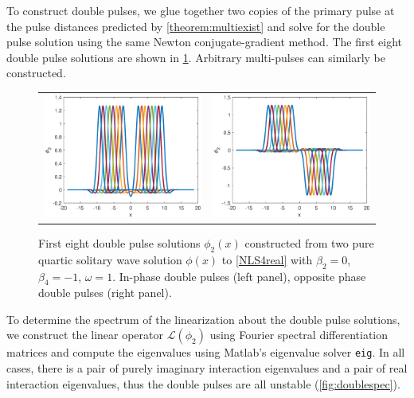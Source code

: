 \documentclass[12pt]{article}
\def\calL{{\mathcal L}}
\begin{document}
To construct double pulses, we glue together two copies of the primary pulse at the pulse distances predicted by \cref{theorem:multiexist} and solve for the double pulse solution using the same Newton conjugate-gradient method. The first eight double pulse solutions are shown in \cref{fig:doublepulses}. Arbitrary multi-pulses can similarly be constructed.

\begin{figure}[H]
\centering
\begin{tabular}{cc}
\includegraphics[width=8cm]{images/DPplus.eps} &
\includegraphics[width=8cm]{images/DPminus.eps}
\end{tabular}
\caption{First eight double pulse solutions $\phi_2(x)$ constructed from two pure quartic solitary wave solution $\phi(x)$ to \cref{NLS4real} with $\beta_2 = 0$, $\beta_4 = -1$, $\omega = 1$. In-phase double pulses (left panel), opposite phase double pulses (right panel). }
\label{fig:doublepulses}
\end{figure} 

To determine the spectrum of the linearization about the double pulse solutions, we construct the linear operator $\calL(\phi_2)$ using Fourier spectral differentiation matrices and compute the eigenvalues using Matlab's eigenvalue solver \texttt{eig}. In all cases, there is a pair of purely imaginary interaction eigenvalues and a pair of real interaction eigenvalues, thus the double pulses are all unstable (\cref{fig:doublespec}).
\end{document}
